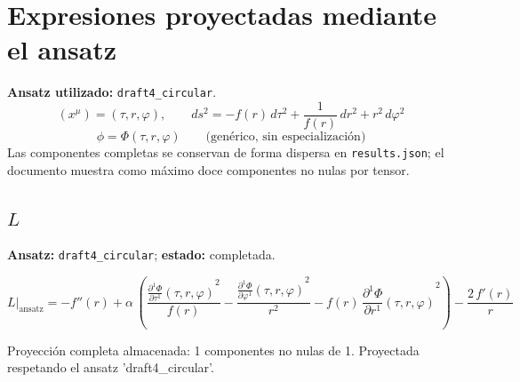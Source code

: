 \documentclass[11pt]{article}
\begin{document}
\section*{Expresiones proyectadas mediante el ansatz}
\textbf{Ansatz utilizado:} \texttt{draft4\_circular}.
\begin{dmath*}[breakdepth={3}]
(x^\mu)=\left(\tau, r, \varphi\right),\qquad ds^2 = -f\!\left(r\right)\,d\tau^2 + \frac{1}{f\!\left(r\right)}\,dr^2 + {r}^{2}\,d\varphi^2
\end{dmath*}
\begin{dmath*}[breakdepth={3}]
\phi = \Phi\!\left(\tau, r, \varphi\right)\qquad\text{(genérico, sin especialización)}
\end{dmath*}
Las componentes completas se conservan de forma dispersa en \texttt{results.json}; el documento muestra como máximo doce componentes no nulas por tensor.
\subsection*{$ L $}
\textbf{Ansatz:} \texttt{draft4\_circular}; \textbf{estado:} completada.\par
\begin{dmath*}[breakdepth={5}]
L\big|_{\mathrm{ansatz}} = -f''\!\left(r\right) + \alpha\,\left(\frac{{\frac{\partial^{1} \Phi}{\partial \tau^{1}}\!\left(\tau, r, \varphi\right)}^{2}}{f\!\left(r\right)} - \frac{{\frac{\partial^{1} \Phi}{\partial \varphi^{1}}\!\left(\tau, r, \varphi\right)}^{2}}{{r}^{2}} - f\!\left(r\right)\,{\frac{\partial^{1} \Phi}{\partial r^{1}}\!\left(\tau, r, \varphi\right)}^{2}\right) - \frac{2\,f'\!\left(r\right)}{r}
\end{dmath*}
\par\smallskip
Proyección completa almacenada: 1 componentes no nulas de 1. Proyectada respetando el ansatz 'draft4\_circular'.\par\medskip
{}
\end{document}
